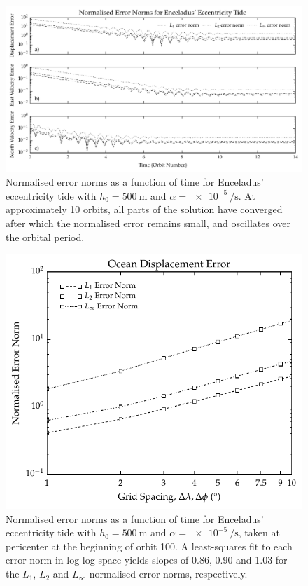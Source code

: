 \begin{figure}[t]
\centering
\includegraphics[width=\linewidth]{Figures/temporal_error_ecc}
\caption{Normalised error norms as a function of time for Enceladus' eccentricity tide with $h_0 = \SI{500}{\metre}$ and $\alpha = \SI{e-5}{\per\second}$. At approximately \num{10} orbits, all parts of the solution have converged after which the normalised error remains small, and oscillates over the orbital period. \label{fig:temporal_error}}
\end{figure}


\begin{figure}[t]
\centering
\includegraphics[width=0.6\linewidth]{Figures/convergence_eta}
\caption{Normalised error norms as a function of time for Enceladus' eccentricity tide with $h_0 = \SI{500}{\metre}$ and $\alpha = \SI{e-5}{\per\second}$, taken at pericenter at the beginning of orbit \num{100}. A least-squares fit to each error norm in log-log space yields slopes of \num{0.86}, \num{0.90} and \num{1.03} for the $L_1$, $L_2$ and $L_{\infty}$ normalised error norms, respectively. \label{fig:spatial_convergence}}
\end{figure}




